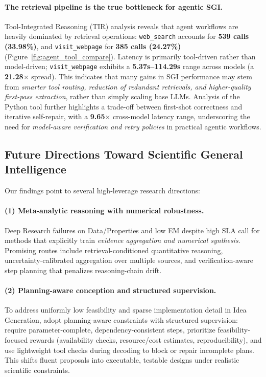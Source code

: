 \paragraph{The retrieval pipeline is the true bottleneck for agentic SGI.}
Tool-Integrated Reasoning (TIR) analysis reveals that agent workflows are heavily dominated by retrieval operations: \texttt{web\_search} accounts for \textbf{539 calls (33.98\%)}, and \texttt{visit\_webpage} for \textbf{385 calls (24.27\%)} (Figure~\ref{fig:agent_tool_compare}). Latency is primarily tool-driven rather than model-driven; \texttt{visit\_webpage} exhibits a \textbf{5.37s--114.29s} range across models (a \textbf{21.28$\times$} spread). This indicates that many gains in SGI performance may stem from \emph{smarter tool routing, reduction of redundant retrievals, and higher-quality first-pass extraction}, rather than simply scaling base LLMs. Analysis of the Python tool further highlights a trade-off between first-shot correctness and iterative self-repair, with a \textbf{9.65$\times$} cross-model latency range, underscoring the need for \emph{model-aware verification and retry policies} in practical agentic workflows.


\subsection{Future Directions Toward Scientific General Intelligence}

Our findings point to several high-leverage research directions:

\paragraph{(1) Meta-analytic reasoning with numerical robustness.}
Deep Research failures on Data/Properties and low EM despite high SLA call for methods that explicitly train \emph{evidence aggregation and numerical synthesis}. Promising routes include retrieval-conditioned quantitative reasoning, uncertainty-calibrated aggregation over multiple sources, and verification-aware step planning that penalizes reasoning-chain drift.

\paragraph{(2) Planning-aware conception and structured supervision.}
To address uniformly low feasibility and sparse implementation detail in Idea Generation, adopt planning-aware constraints with structured supervision: require parameter-complete, dependency-consistent steps, prioritize feasibility-focused rewards (availability checks, resource/cost estimates, reproducibility), and use lightweight tool checks during decoding to block or repair incomplete plans. This shifts fluent proposals into executable, testable designs under realistic scientific constraints.

